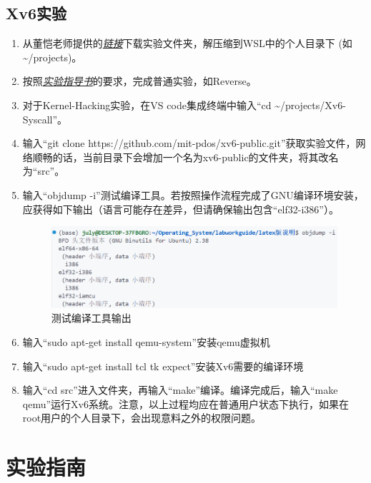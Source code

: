 \documentclass[fontset=ubuntu]{ctexart}
\let\oldhref\href{}
\renewcommand{\href}[2]{\oldhref{#1}{\textit{#2}}}
\begin{document}
\subsection{Xv6实验}

\begin{enumerate}
    \item 从董恺老师提供的\href{https://seunic-my.sharepoint.cn/:u:/g/personal/101011912_seu_edu_cn/EUWd54wqsdJNu_h-sHQ1X2YBiZ24oi4rryRwXdoFGWpGsw?e=vDNOXc}{链接}下载实验文件夹，解压缩到WSL中的个人目录下 (如\~{}/projects)。
    \item 按照\href{https://www.overleaf.com/project/604ac6e691e6cf4d8ba0b24a}{实验指导书}的要求，完成普通实验，如Reverse。
    \item 对于Kernel-Hacking实验，在VS code集成终端中输入“cd \~{}/projects/Xv6-Syscall”。
    \item 输入“git clone https://github.com/mit-pdos/xv6-public.git”获取实验文件，网络顺畅的话，当前目录下会增加一个名为xv6-public的文件夹，将其改名为“src”。
    \item 输入“objdump -i”测试编译工具。若按照操作流程完成了GNU编译环境安装，应获得如下输出（语言可能存在差异，但请确保输出包含“elf32-i386”）。
          \begin{figure}[htbp]
              \centering
              \includegraphics[width=\textwidth]{./README.assets/objdump.png}
              \caption{测试编译工具输出}
          \end{figure}
    \item 输入“sudo apt-get install qemu-system”安装qemu虚拟机
    \item 输入“sudo apt-get install tcl tk expect”安装Xv6需要的编译环境
    \item 输入“cd src”进入文件夹，再输入“make”编译。编译完成后，输入“make qemu”运行Xv6系统。注意，以上过程均应在普通用户状态下执行，如果在root用户的个人目录下，会出现意料之外的权限问题。
\end{enumerate}

\newpage{}

\section{实验指南}
\end{document}
